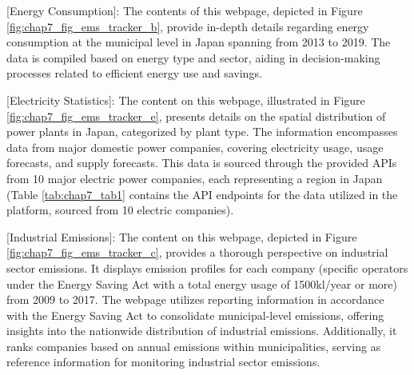 [Energy Consumption]: The contents of this webpage, depicted in Figure \ref{fig:chap7_fig_ems_tracker_b}, provide in-depth details regarding energy consumption at the municipal level in Japan spanning from 2013 to 2019. The data is compiled based on energy type and sector, aiding in decision-making processes related to efficient energy use and savings. \par

[Electricity Statistics]: The content on this webpage, illustrated in Figure \ref{fig:chap7_fig_ems_tracker_e}, presents details on the spatial distribution of power plants in Japan, categorized by plant type. The information encompasses data from major domestic power companies, covering electricity usage, usage forecasts, and supply forecasts. This data is sourced through the provided APIs from 10 major electric power companies, each representing a region in Japan (Table \ref{tab:chap7_tab1} contains the API endpoints for the data utilized in the platform, sourced from 10 electric companies). \par

[Industrial Emissions]: The content on this webpage, depicted in Figure \ref{fig:chap7_fig_ems_tracker_c}, provides a thorough perspective on industrial sector emissions. It displays emission profiles for each company (specific operators under the Energy Saving Act with a total energy usage of 1500kl/year or more) from 2009 to 2017. The webpage utilizes reporting information in accordance with the Energy Saving Act to consolidate municipal-level emissions, offering insights into the nationwide distribution of industrial emissions. Additionally, it ranks companies based on annual emissions within municipalities, serving as reference information for monitoring industrial sector emissions.\par

